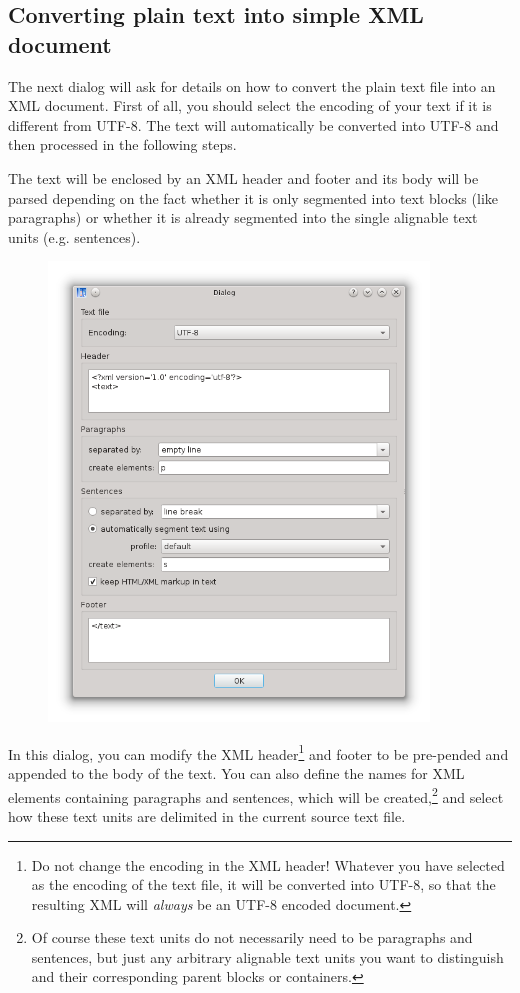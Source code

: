 \documentclass[a4paper,10pt,oneside]{book}
\begin{document}
\subsection{Converting plain text into simple XML document}\label{ch:detail:managing_local:new:txt2xml}

The next dialog will ask for details on how to convert the plain text file into an XML document. First of all, you should select the encoding of your text if it is different from UTF-8. The text will automatically be converted into UTF-8 and then processed in the following steps.

The text will be enclosed by an XML header and footer and its body will be parsed depending on the fact whether it is only segmented into text blocks (like paragraphs) or whether it is already segmented into the single alignable text units (e.g. sentences).

\begin{figure}[htb]
 \includegraphics[width=0.9\textwidth]{screenshots/text_import.png}
\end{figure}

In this dialog, you can modify the XML header\footnote{Do not change the encoding in the XML header! Whatever you have selected as the encoding of the text file, it will be converted into UTF-8, so that the resulting XML will \emph{always} be an UTF-8 encoded document.} and footer to be pre-pended and appended to the body of the text. You can also define the names for XML elements containing paragraphs and sentences, which will be created,\footnote{Of course these text units do not necessarily need to be paragraphs and sentences, but just any arbitrary alignable text units you want to distinguish and their corresponding parent blocks or containers.} and select how these text units are delimited in the current source text file.
\end{document}
